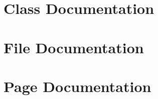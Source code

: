 \documentclass[a4paper]{book}
\begin{document}
\chapter{Class Documentation}








\chapter{File Documentation}


\chapter{Page Documentation}

\printindex
\end{document}
